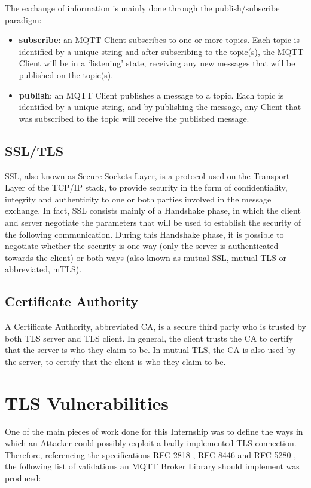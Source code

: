 \documentclass[binding=0.6cm,noexaminfo]{sapthesis}
\begin{document}
The exchange of information is mainly done through the publish/subscribe paradigm:
\begin{itemize}
	\item \textbf{subscribe}: an MQTT Client subscribes to one or more topics. Each topic is identified by a unique string and after subscribing to the topic(s), the MQTT Client will be in a `listening' state, receiving any new messages that will be published on the topic(s).
	\item \textbf{publish}: an MQTT Client publishes a message to a topic. Each topic is identified by a unique string, and by publishing the message, any Client that was subscribed to the topic will receive the published message.
\end{itemize}

\section{SSL/TLS}
SSL, also known as Secure Sockets Layer, is a protocol used on the Transport Layer of the TCP/IP stack, to provide security in the form of confidentiality, integrity and authenticity to one or both parties involved in the message exchange. In fact, SSL consists mainly of a Handshake phase, in which the client and server negotiate the parameters that will be used to establish the security of the following communication. During this Handshake phase, it is possible to negotiate whether the security is one-way (only the server is authenticated towards the client) or both ways (also known as mutual SSL, mutual TLS or abbreviated, mTLS).

\section{Certificate Authority}
A Certificate Authority, abbreviated CA, is a secure third party who is trusted by both TLS server and TLS client. In general, the client trusts the CA to certify that the server is who they claim to be. In mutual TLS, the CA is also used by the server, to certify that the client is who they claim to be.

\chapter{TLS Vulnerabilities}
One of the main pieces of work done for this Internship was to define the ways in which an Attacker could possibly exploit a badly implemented TLS connection. Therefore, referencing the specifications RFC 2818 \cite{rfc2818}, RFC 8446 \cite{rfc8446} and RFC 5280 \cite{rfc5280}, the following list of validations an MQTT Broker Library should implement was produced:
\end{document}
